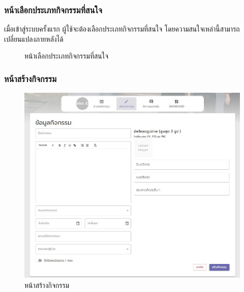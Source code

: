 \subsubsection{หน้าเลือกประเภทกิจกรรมที่สนใจ}
เมื่อเข้าสู่ระบบครั้งแรก ผู้ใช้จะต้องเลือกประเภทกิจกรรมที่สนใจ โดยความสนใจเหล่านี้สามารถเปลี่ยนแปลงภายหลังได้
\begin{figure}[H]
\begin{center}
\end{center}
\caption[หน้าเลือกประเภทกิจกรรมที่สนใจ]{หน้าเลือกประเภทกิจกรรมที่สนใจ}
\label{fig:tag-choose}
\end{figure}
\subsubsection{หน้าสร้างกิจกรรม}
\begin{figure}[H]
\begin{center}
\includegraphics[scale=0.6]{public/create-act.jpg}
\end{center}
\caption[หน้าสร้างกิจกรรม]{หน้าสร้างกิจกรรม}
\label{fig:create-page}
\end{figure}
